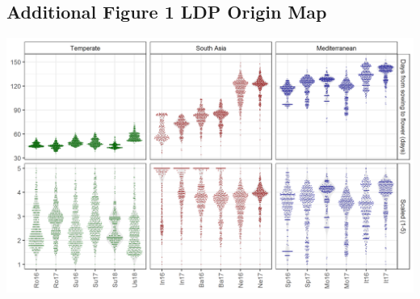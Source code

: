 \documentclass[
]{article}
\begin{document}
\hypertarget{additional-figure-1-ldp-origin-map}{%
\subsection{Additional Figure 1 LDP Origin
Map}\label{additional-figure-1-ldp-origin-map}}

\includegraphics[width=1\linewidth]{Phenology_Vignette_files/figure-latex/unnamed-chunk-8-1}
\end{document}
